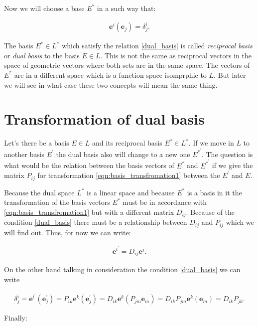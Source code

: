 \documentclass{book}
\begin{document}
Now we will choose a base $E^*$ in a such way that:

\begin{align}
\boldsymbol{e}^{i}(\boldsymbol{e}_j) = \delta^{i}_j. \label{dual_basis}
\end{align}

The basis $E^{*} \in L^{*}$ which satisfy the relation \eqref{dual_basis} is called \emph{reciprocal basis} or \emph{dual basis} to the basis $E \in L$. This is not the same as reciprocal vectors in the space of geometric vectors where both sets are in the same space. The vectors of $E^{*}$ are in a different space which is a function space isomprphic to $L$. But later we will see in what case these two concepts will mean the same thing.

\section{Transformation of dual basis}

Let's there be a basis $E \in L$ and its reciprocal basis $E^{*} \in L^*$. If we move in $L$ to another basis $E^{'}$ the dual basis also will change to a new one $E^{*}^{'}$. The question is what would be the relation between the basis vectors of $E^{*}$ and $E^{*}^{'}$ if we give the matrix $P_{ij}$ for transformation \eqref{eqn:basis_transfromation1} between the $E^{'}$ and $E$.

Because the dual space $L^*$ is a linear space and because $E^{*}$ is a basis in it the transformation of the basis vectors $E^{*}$ must be in accordance with \eqref{eqn:basis_transfromation1} but with a different matrix $D_{ij}$. Because of the condition \eqref{dual_basis} there must be a relationship between $D_{ij}$ and $P_{ij}$ which we will find out. Thus, for now we can write:

\begin{align*}
\boldsymbol{e^{i}^{'}} = D_{ij}\boldsymbol{e}^{j}.
\end{align*}

On the other hand talking in consideration the condition \eqref{dual_basis} we can write

\begin{align}
\delta^{i}_j = \boldsymbol{e}^{i}^{'}(\boldsymbol{e}^{'}_j) = P_{ik}\boldsymbol{e}^{k}(\boldsymbol{e}^{'}_j)
= D_{ik}\boldsymbol{e}^{k}(P_{jm}\boldsymbol{e}_m)
= D_{ik}P_{jm}\boldsymbol{e}^{k}(\boldsymbol{e}_m) = D_{ik}P_{jk}.
\end{align}

Finally:
\end{document}
